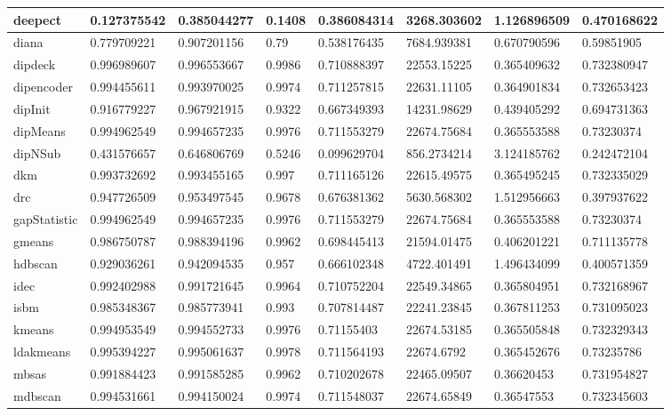\begin{table}[H]
\begin{tabular}{|l|l|l|l|l|l|l|l|}
\hline
deepect & 0.127375542 & 0.385044277 & 0.1408 & 0.386084314 & 3268.303602 & 1.126896509 & 0.470168622 \\
\hline
diana & 0.779709221 & 0.907201156 & 0.79 & 0.538176435 & 7684.939381 & 0.670790596 & 0.59851905 \\
\hline
dipdeck & 0.996989607 & 0.996553667 & 0.9986 & 0.710888397 & 22553.15225 & 0.365409632 & 0.732380947 \\
\hline
dipencoder & 0.994455611 & 0.993970025 & 0.9974 & 0.711257815 & 22631.11105 & 0.364901834 & 0.732653423 \\
\hline
dipInit & 0.916779227 & 0.967921915 & 0.9322 & 0.667349393 & 14231.98629 & 0.439405292 & 0.694731363 \\
\hline
dipMeans & 0.994962549 & 0.994657235 & 0.9976 & 0.711553279 & 22674.75684 & 0.365553588 & 0.73230374 \\
\hline
dipNSub & 0.431576657 & 0.646806769 & 0.5246 & 0.099629704 & 856.2734214 & 3.124185762 & 0.242472104 \\
\hline
dkm & 0.993732692 & 0.993455165 & 0.997 & 0.711165126 & 22615.49575 & 0.365495245 & 0.732335029 \\
\hline
drc & 0.947726509 & 0.953497545 & 0.9678 & 0.676381362 & 5630.568302 & 1.512956663 & 0.397937622 \\
\hline
gapStatistic & 0.994962549 & 0.994657235 & 0.9976 & 0.711553279 & 22674.75684 & 0.365553588 & 0.73230374 \\
\hline
gmeans & 0.986750787 & 0.988394196 & 0.9962 & 0.698445413 & 21594.01475 & 0.406201221 & 0.711135778 \\
\hline
hdbscan & 0.929036261 & 0.942094535 & 0.957 & 0.666102348 & 4722.401491 & 1.496434099 & 0.400571359 \\
\hline
idec & 0.992402988 & 0.991721645 & 0.9964 & 0.710752204 & 22549.34865 & 0.365804951 & 0.732168967 \\
\hline
isbm & 0.985348367 & 0.985773941 & 0.993 & 0.707814487 & 22241.23845 & 0.367811253 & 0.731095023 \\
\hline
kmeans & 0.994953549 & 0.994552733 & 0.9976 & 0.71155403 & 22674.53185 & 0.365505848 & 0.732329343 \\
\hline
ldakmeans & 0.995394227 & 0.995061637 & 0.9978 & 0.711564193 & 22674.6792 & 0.365452676 & 0.73235786 \\
\hline
mbsas & 0.991884423 & 0.991585285 & 0.9962 & 0.710202678 & 22465.09507 & 0.36620453 & 0.731954827 \\
\hline
mdbscan & 0.994531661 & 0.994150024 & 0.9974 & 0.711548037 & 22674.65849 & 0.36547553 & 0.732345603 \\

\end{tabular}
\end{table}
